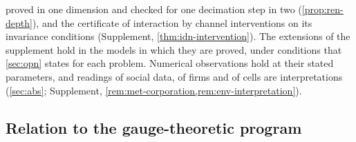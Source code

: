 proved in one dimension and checked for one decimation step in two (\cref{prop:ren-depth}), and the certificate of interaction by channel interventions on its invariance conditions (Supplement, \cref{thm:idn-intervention}). The extensions of the supplement hold in the models in which they are proved, under conditions that \cref{sec:opn} states for each problem. Numerical observations hold at their stated parameters, and readings of social data, of firms and of cells are interpretations (\cref{sec:abs}; Supplement, \cref{rem:met-corporation,rem:env-interpretation}).

\subsection{Relation to the gauge-theoretic program}\label{sec:dis-gauge}

